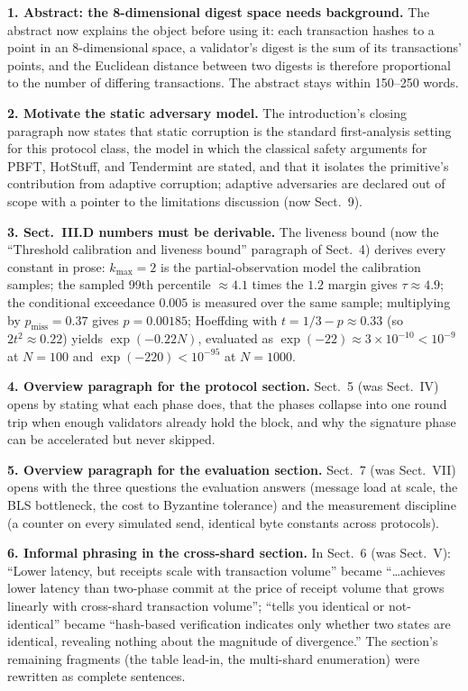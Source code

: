 \documentclass[10pt]{article}
\begin{document}
\textbf{1. Abstract: the 8-dimensional digest space needs background.} The
abstract now explains the object before using it: each transaction hashes
to a point in an 8-dimensional space, a validator's digest is the sum of
its transactions' points, and the Euclidean distance between two digests is
therefore proportional to the number of differing transactions. The
abstract stays within 150--250 words.

\textbf{2. Motivate the static adversary model.} The introduction's closing
paragraph now states that static corruption is the standard first-analysis
setting for this protocol class, the model in which the classical safety
arguments for PBFT, HotStuff, and Tendermint are stated, and that it
isolates the primitive's contribution from adaptive corruption; adaptive
adversaries are declared out of scope with a pointer to the limitations
discussion (now Sect.~9).

\textbf{3. Sect.~III.D numbers must be derivable.} The liveness bound (now
the ``Threshold calibration and liveness bound'' paragraph of Sect.~4)
derives every constant in prose: $k_{\max}{=}2$ is the partial-observation
model the calibration samples; the sampled 99th percentile ${\approx}4.1$
times the $1.2$ margin gives $\tau \approx 4.9$; the conditional exceedance
$0.005$ is measured over the same sample; multiplying by $p_{\mathrm{miss}}
= 0.37$ gives $p = 0.00185$; Hoeffding with $t = 1/3 - p \approx 0.33$
(so $2t^2 \approx 0.22$) yields $\exp(-0.22N)$, evaluated as $\exp(-22)
\approx 3{\times}10^{-10} < 10^{-9}$ at $N{=}100$ and $\exp(-220) <
10^{-95}$ at $N{=}1000$.

\textbf{4. Overview paragraph for the protocol section.} Sect.~5 (was
Sect.~IV) opens by stating what each phase does, that the phases collapse
into one round trip when enough validators already hold the block, and why
the signature phase can be accelerated but never skipped.

\textbf{5. Overview paragraph for the evaluation section.} Sect.~7 (was
Sect.~VII) opens with the three questions the evaluation answers (message
load at scale, the BLS bottleneck, the cost to Byzantine tolerance) and the
measurement discipline (a counter on every simulated send, identical byte
constants across protocols).

\textbf{6. Informal phrasing in the cross-shard section.} In Sect.~6 (was
Sect.~V): ``Lower latency, but receipts scale with transaction volume''
became ``\ldots achieves lower latency than two-phase commit at the price
of receipt volume that grows linearly with cross-shard transaction
volume''; ``tells you identical or not-identical'' became ``hash-based
verification indicates only whether two states are identical, revealing
nothing about the magnitude of divergence.'' The section's remaining
fragments (the table lead-in, the multi-shard enumeration) were rewritten
as complete sentences.
\end{document}
